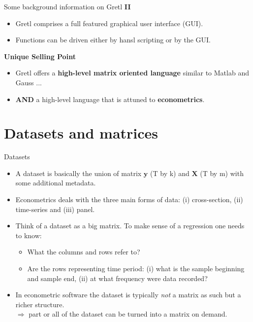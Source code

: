 \documentclass{beamer}[11pt]
\begin{document}
\begin{frame}{Some background information on Gretl \textbf{II}}
	\begin{itemize}
		\item Gretl comprises a full featured graphical user interface (GUI).
		\item Functions can be driven either by hansl scripting or by the GUI.
	\end{itemize}
	\vspace{0.5cm}
	\textbf{Unique Selling Point}
	
	\begin{itemize}
		\item Gretl offers a \textbf{high-level matrix oriented language} similar to Matlab and Gauss ...
		\item \textbf{AND} a high-level language that is attuned to \textbf{econometrics}.
	\end{itemize}
	
\end{frame}

\section{Datasets and matrices}

\begin{frame}{Datasets}
	\begin{itemize}
		\item A dataset is basically the union of matrix $ \textbf{y} $ (T by k) and $ \textbf{X} $ (T by m) with some additional metadata.
		\item Econometrics deals with the three main forms of data: (i) cross-section, (ii) time-series and (iii) panel.
		\item Think of a dataset as a big matrix. To make sense of a regression one needs to know:
		\begin{itemize}
			\item What the columns and rows refer to?
			\item Are the rows representing time period: (i) what is the sample beginning and sample end, (ii) at what frequency were data recorded?
		\end{itemize}
		\item In econometric software the dataset is typically \textit{not} a matrix as such but a richer structure. \\
		$ \Rightarrow $ part or all of the dataset can be turned into a matrix on demand.
	\end{itemize}
\end{frame}
\end{document}
